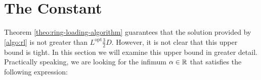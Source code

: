 \section{The Constant}

Theorem \cref{theo:ring-loading-algorithm} guarantees that the solution provided by \cref{algo:rl} is not greater than $L^\mathrm{opt}\frac{3}{2} D$.
However, it is not clear that this upper bound is tight.
In this section we will examine this upper bound in greater detail.
Practically speaking, we are looking for the infimum $\alpha \in \mathbb{R}$ that satisfies the following expression:
